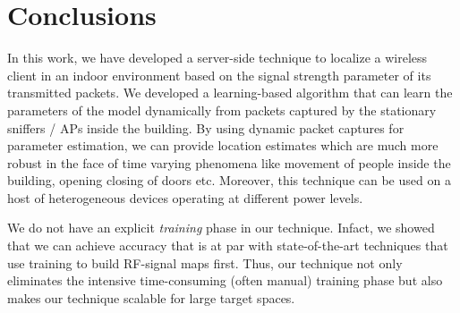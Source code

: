 
\section{Conclusions}
\label{sec:conclusions}

In this work, we have developed a server-side technique to localize a
wireless client in an indoor environment based on the signal strength
parameter of its transmitted packets. We developed a learning-based
algorithm that can learn the parameters of the model
dynamically from packets captured by the stationary sniffers / APs
inside the building. By using dynamic packet captures for parameter
estimation, we can provide location estimates which are much more robust in the face of time
varying phenomena like movement of people inside the building, opening
closing of doors etc. Moreover, this technique can be used on a host of
heterogeneous devices operating at different power levels. 

We do not have an explicit {\it training} phase in our technique.
Infact, we showed that we can achieve accuracy that is at par with state-of-the-art
techniques that use training to build RF-signal maps first. Thus,
our technique not only eliminates the intensive time-consuming (often manual) training phase
but also makes our technique scalable for large target spaces.

